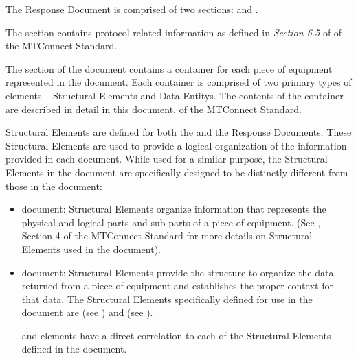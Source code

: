 The  \gls{Response Document} is comprised of two sections:  and .

The  section contains protocol related information as defined in \textit{Section 6.5} of  of the MTConnect Standard.

The  section of the  document contains a  container for each piece of equipment represented in the document.  Each  container is comprised of two primary types of elements – \glspl{Structural Element} and \glspl{Data Entity}.  The contents of the  container are described in detail in this document,  of the MTConnect Standard.

\glspl{Structural Element} are defined for both the  and the  \glspl{Response Document}.  These \glspl{Structural Element} are used to provide a logical organization of the information provided in each document.  While used for a similar purpose, the \glspl{Structural Element} in the  document are specifically designed to be distinctly different from those in the  document:  

\begin{itemize}

\item {} document: \glspl{Structural Element} organize information that represents the physical and logical parts and sub-parts of a piece of equipment.  (See , Section 4 of the MTConnect Standard for more details on \glspl{Structural Element} used in the  document).  

\item {} document: \glspl{Structural Element} provide the structure to organize the data returned from a piece of equipment and establishes the proper context for that data.  The \glspl{Structural Element} specifically defined for use in the  document are  (see ) and  (see ).   

 and  elements have a direct correlation to each of the \glspl{Structural Element} defined in the  document.
\end{itemize}

